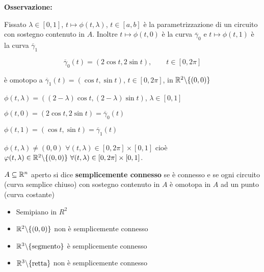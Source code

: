 \textbf{Osservazione:}

Fissato $\lambda \in[0,1]$, $t \mapsto \phi(t,\lambda)$, $t \in [a,b]$ è la parametrizzazione di un circuito con sostegno contenuto  in $A$. Inoltre  $t \mapsto \phi(t,0)$ è la curva $\overline{\gamma}_0$ e $t \mapsto \phi(t,1)$ è la curva $\overline{\gamma}_1$
	
	
\begin{exbar}
\begin{example}
	$$\overline{\gamma}_0 (t)=(2\cos t , 2 \sin t), \qquad t\in [0,2\pi]$$
	
	è omotopo a $\overline{\gamma}_1(t)=(\cos t , \sin t)$, $t \in [0,2\pi]$, in $\mathbb{R}^2\backslash \{(0,0)\}$
	
	$\phi(t,\lambda)=((2-\lambda)\cos t, (2-\lambda)\sin t)$,  $\lambda \in [0,1]$
	
	$\phi (t,0) =(2\cos t, 2 \sin t)=\overline{\gamma}_0 (t)$
	
	$\phi(t,1)=(\cos t , \sin t)=\overline{\gamma}_1(t)$
	
	$\phi(t,\lambda) \neq (0,0) \,\, \forall (t,\lambda)\in [0,2\pi]\times[0,1]$ cioè $\varphi(t,\lambda) \in \mathbb{R}^2 \backslash \{(0,0)\}\,\, \forall (t,\lambda)\in[0,2\pi]\times [0,1]$.
\end{example}
\end{exbar}


\begin{definition}
	$A \subseteq \mathbb{R}^n$ aperto si dice \textbf{semplicemente connesso} se è connesso e se ogni circuito  {\color{blue}(curva semplice chiuso)} con sostegno contenuto in $A$ è omotopa in $A$ ad un punto {\color{blue}(curva costante)}
\end{definition}
	
	
\begin{exbar}
\begin{example}
		\begin{itemize}
			\item Semipiano in $R^2$
			
			
			\item $\mathbb{R}^2 \backslash \{(0,0)\}$ non è semplicemente connesso
			
			
			\item $\mathbb{R}^3 \backslash \{\text{segmento}\}$ è semplicemente connesso
			
			
			\item $\mathbb{R}^3 \backslash \{\text{retta}\}$ non è semplicemente connesso
			
		\end{itemize}
\end{example}
\end{exbar}
	
